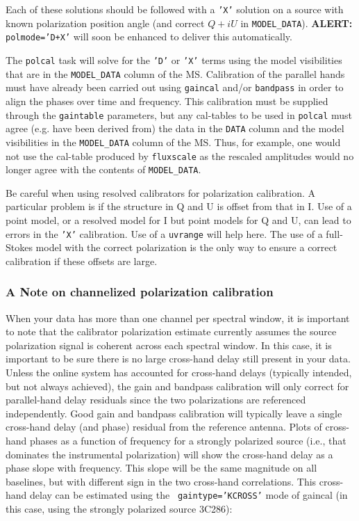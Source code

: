 Each of these solutions should be followed with a {\tt 'X'} solution
on a source with known polarization position angle (and correct $Q+iU$
in {\tt MODEL\_DATA}).  
{\bf ALERT:} {\tt polmode='D+X'} will soon be enhanced to 
deliver this automatically.
           
The {\tt polcal} task will solve for the {\tt 'D'} or {\tt 'X'} terms
using the model visibilities that are in the {\tt MODEL\_DATA} column
of the MS.  Calibration of the parallel hands must have already been
carried out using {\tt gaincal} and/or {\tt bandpass} in order to
align the phases over time and frequency.  This calibration must be
supplied through the {\tt gaintable}
parameters, but any cal-tables to be used in {\tt polcal} must agree
(e.g. have been derived from) the data in the {\tt DATA} column and
the model visibilities in the {\tt MODEL\_DATA} column of the MS.
Thus, for example, one would not use the cal-table produced by
{\tt fluxscale} as the rescaled amplitudes would no longer agree with
the contents of {\tt MODEL\_DATA}.

Be careful when using resolved calibrators for polarization
calibration.  A particular problem is if the structure in Q and U is
offset from that in I.  Use of a point model, or a resolved model for
I but point models for Q and U, can lead to errors in the {\tt 'X'} 
calibration.  Use of a {\tt uvrange} will help here.  The use of a
full-Stokes model with the correct polarization is the only way to 
ensure a correct calibration if these offsets are large.

\subsubsection{A Note on channelized polarization calibration}

When your data has more than one channel per spectral window, it is
important to note that the calibrator polarization estimate currently
assumes the source polarization signal is coherent across each
spectral window.  In this case, it is important to be sure there is no
large cross-hand delay still present in your data.  Unless the online
system has accounted for cross-hand delays (typically intended, but
not always achieved), the gain and bandpass calibration will only
correct for parallel-hand delay residuals since the two polarizations
are referenced independently.  Good gain and bandpass calibration will
typically leave a single cross-hand delay (and phase) residual from
the reference antenna.  Plots of cross-hand phases as a function of
frequency for a strongly polarized source (i.e., that dominates the
instrumental polarization) will show the cross-hand delay as a phase
slope with frequency.  This slope will be the same magnitude on all
baselines, but with different sign in the two cross-hand correlations.
This cross-hand delay can be estimated using the {\tt
gaintype='KCROSS'} mode of gaincal (in this case, using the strongly
polarized source 3C286):

